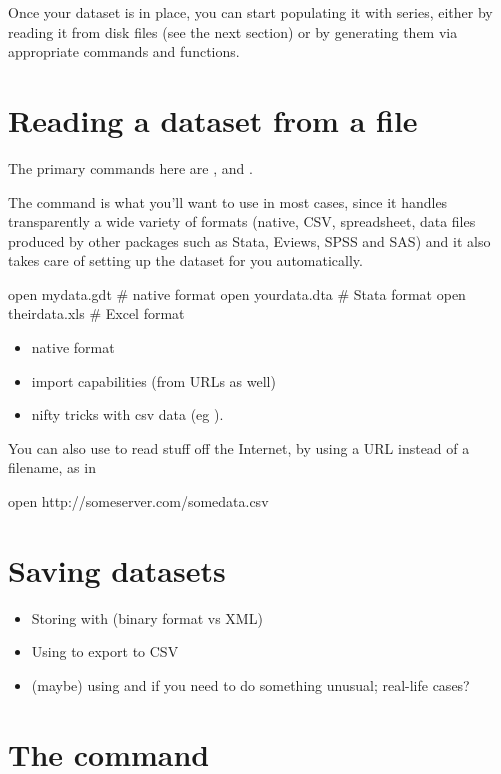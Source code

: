 Once your dataset is in place, you can start populating it with
series, either by reading it from disk files (see the next section) or
by generating them via appropriate commands and functions.

\section{Reading a dataset from a file}

The primary commands here are ,  and .

The  command is what you'll want to use in most cases, since
it handles transparently a wide variety of formats (native, CSV,
spreadsheet, data files produced by other packages such as
\textsf{Stata}, \textsf{Eviews}, \textsf{SPSS} and \textsf{SAS}) and
it also takes care of setting up the dataset for you automatically.
\begin{code}
  open mydata.gdt    # native format
  open yourdata.dta  # Stata format
  open theirdata.xls # Excel format
\end{code}

\begin{itemize}
\item native format
\item import capabilities (from URLs as well)
\item nifty tricks with csv data (eg ).
\end{itemize}

You can also use  to read stuff off the Internet, by using a URL
instead of a filename, as in
\begin{code}
  open http://someserver.com/somedata.csv
\end{code}

\section{Saving datasets}

\begin{itemize}
\item Storing with  (binary format vs XML)
\item Using  to export to CSV
\item (maybe) using  and  if you need to do
  something unusual; real-life cases?
\end{itemize}

\section{The  command}

